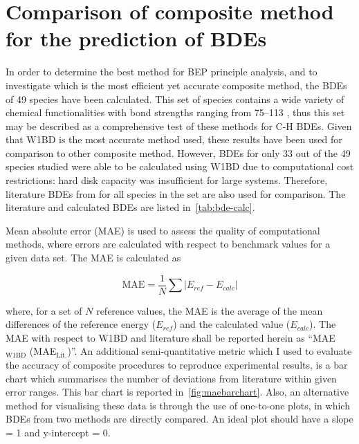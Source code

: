 \section{Comparison of composite method for the prediction of BDEs}

In order to determine the best method for BEP principle analysis, and to investigate which is the most efficient yet accurate composite method, the BDEs of 49 species have been calculated. This set of species contains a wide variety of chemical functionalities with bond strengths ranging from 75--113 \kcalmol, thus this set may be described as a comprehensive test of these methods for C-H BDEs. Given that W1BD is the most accurate method used, these results have been used for comparison to other composite method. However, BDEs for only 33 out of the 49 species studied were able to be calculated using W1BD due to computational cost restrictions: hard disk capacity was insufficient for large systems. Therefore, literature BDEs from \citet{Luo2002} for all species in the set are also used for comparison. The literature and calculated BDEs are listed in~\ref{tab:bde-calc}.

\begin{landscape}

\end{landscape}

Mean absolute error (MAE) is used to assess the quality of computational methods, where errors are calculated with respect to benchmark values for a given data set.\cite{Savin2014} The MAE is calculated as

\begin{equation}
  \mathrm{MAE} = \frac{1}{N} \sum | E_{ref} - E_{calc}|
\end{equation}

\noindent where, for a set of $N$ reference values, the MAE is the average of the mean differences of the reference energy ($E_{ref}$) and the calculated value ($E_{calc}$). The MAE with respect to W1BD and literature shall be reported herein as ``MAE$_{\mathrm{W1BD}}$ (MAE$_{\mathrm{Lit.}}$)''. An additional semi-quantitative metric which I used to evaluate the accuracy of composite procedures to reproduce experimental results, is a bar chart which summarises the number of deviations from literature within given error ranges. This bar chart is reported in~\ref{fig:maebarchart}. Also, an alternative method for visualising these data is through the use of one-to-one plots, in which BDEs from two methods are directly compared. An ideal plot should have a slope = 1 and y-intercept = 0.

